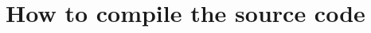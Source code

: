 \documentclass[a4paper,fleqn]{book}
\begin{document}
% 
% 
% 




\appendix

\chapter{How to compile the source code}
\end{document}
